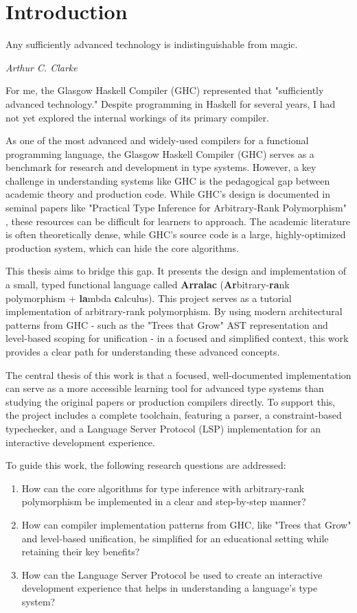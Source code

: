 \chapter{Introduction}
\label{chap:Introduction}

\epigraph{Any sufficiently advanced technology is indistinguishable from magic.}{\textit{Arthur C. Clarke}}

For me, the Glasgow Haskell Compiler (GHC) \cite{ghc-site-2025} represented that "sufficiently advanced technology." Despite programming in Haskell for several years, I had not yet explored the internal workings of its primary compiler.

As one of the most advanced and widely-used compilers for a functional programming language, the Glasgow Haskell Compiler (GHC) serves as a benchmark for research and development in type systems. However, a key challenge in understanding systems like GHC is the pedagogical gap between academic theory and production code. While GHC's design is documented in seminal papers like "Practical Type Inference for Arbitrary-Rank Polymorphism" \cite{jones-practical-2007}, these resources can be difficult for learners to approach. The academic literature is often theoretically dense, while GHC's source code is a large, highly-optimized production system, which can hide the core algorithms.

This thesis aims to bridge this gap. It presents the design and implementation of a small, typed functional language called \textbf{Arralac} (\textbf{Ar}bitrary-\textbf{ra}nk polymorphism + \textbf{la}mbda \textbf{c}alculus). This project serves as a tutorial implementation of arbitrary-rank polymorphism. By using modern architectural patterns from GHC - such as the "Trees that Grow" AST representation and level-based scoping for unification - in a focused and simplified context, this work provides a clear path for understanding these advanced concepts.

The central thesis of this work is that a focused, well-documented implementation can serve as a more accessible learning tool for advanced type systems than studying the original papers or production compilers directly. To support this, the project includes a complete toolchain, featuring a parser, a constraint-based typechecker, and a Language Server Protocol (LSP) implementation for an interactive development experience.

To guide this work, the following research questions are addressed:
\begin{enumerate}
    \item How can the core algorithms for type inference with arbitrary-rank polymorphism be implemented in a clear and step-by-step manner?
    \item How can compiler implementation patterns from GHC, like "Trees that Grow" and level-based unification, be simplified for an educational setting while retaining their key benefits?
    \item How can the Language Server Protocol be used to create an interactive development experience that helps in understanding a language's type system?
\end{enumerate}

